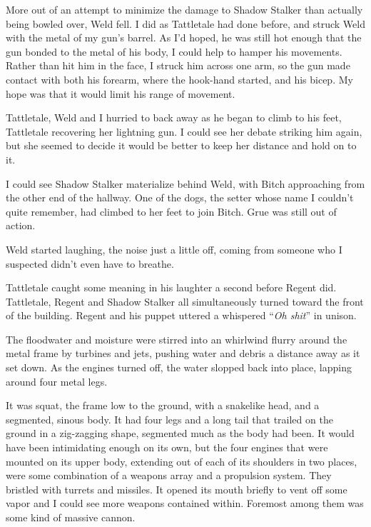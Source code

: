 More out of an attempt to minimize the damage to Shadow Stalker than actually being bowled over, Weld fell.  I did as Tattletale had done before, and struck Weld with the metal of my gun's barrel.  As I'd hoped, he was still hot enough that the gun bonded to the metal of his body, I could help to hamper his movements.  Rather than hit him in the face, I struck him across one arm, so the gun made contact with both his forearm, where the hook-hand started, and his bicep.  My hope was that it would limit his range of movement.



Tattletale, Weld and I hurried to back away as he began to climb to his feet, Tattletale recovering her lightning gun.   I could see her debate striking him again, but she seemed to decide it would be better to keep her distance and hold on to it.



I could see Shadow Stalker materialize behind Weld, with Bitch approaching from the other end of the hallway.  One of the dogs, the setter whose name I couldn't quite remember, had climbed to her feet to join Bitch.  Grue was still out of action.



Weld started laughing, the noise just a little off, coming from someone who I suspected didn't even have to breathe.



Tattletale caught some meaning in his laughter a second before Regent did.  Tattletale, Regent and Shadow Stalker all simultaneously turned toward the front of the building.  Regent and his puppet uttered a whispered ``\emph{Oh shit}'' in unison.



The floodwater and moisture were stirred into an whirlwind flurry around the metal frame by turbines and jets, pushing water and debris a distance away as it set down.  As the engines turned off, the water slopped back into place, lapping around four metal legs.



It was squat, the frame low to the ground, with a snakelike head, and a segmented, sinous body.  It had four legs and a long tail that trailed on the ground in a zig-zagging shape, segmented much as the body had been.  It would have been intimidating enough on its own, but the four engines that were mounted on its upper body, extending out of each of its shoulders in two places, were some combination of a weapons array and a propulsion system.  They bristled with turrets and missiles.  It opened its mouth briefly to vent off some vapor and I could see more weapons contained within.  Foremost among them was some kind of massive cannon.



